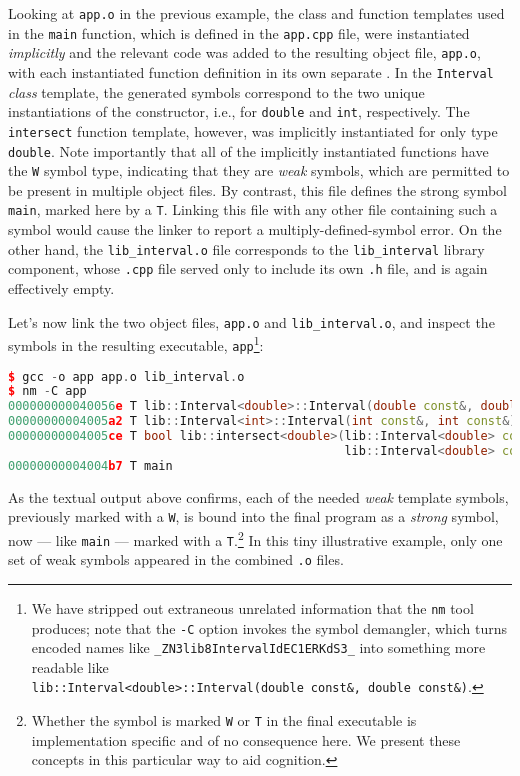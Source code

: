 \noindent Looking at \lstinline!app.o! in the previous example, the class and
function templates used in the \lstinline!main! function, which is
defined in the \lstinline!app.cpp! file, were instantiated
\emph{implicitly} and the relevant code was added to the resulting
object file, \lstinline!app.o!, with each instantiated function definition
in its own separate . In the \lstinline!Interval!
\emph{class} template, the generated symbols correspond to the two
unique instantiations of the constructor, i.e., for \lstinline!double! and
\lstinline!int!, respectively. The \lstinline!intersect! function 
template, however, was implicitly instantiated for only type
\lstinline!double!. Note importantly that all of the implicitly
instantiated functions have the \lstinline!W! symbol type, indicating that
they are \emph{weak} symbols, which are permitted to be present in
multiple object files. By contrast, this file defines the strong symbol
\lstinline!main!, marked here by a \lstinline!T!. Linking this file with any
other file containing such a symbol would cause the linker to report a
multiply-defined-symbol error. On the other hand, the
\lstinline!lib_interval.o! file corresponds to the
\lstinline!lib_interval! library component, whose \lstinline!.cpp! file
served only to include its own \lstinline!.h! file, and is again
effectively empty.

Let's now link the two object files, \lstinline!app.o! and
\lstinline!lib_interval.o!, and inspect the symbols in the resulting
executable, \lstinline!app!{\cprotect\footnote{We have stripped out
extraneous unrelated information that the \lstinline!nm! tool produces;
note that the \lstinline!-C! option invokes the symbol demangler, which
turns encoded names like \lstinline!_ZN3lib8IntervalIdEC1ERKdS3_! into
something more readable like
  \lstinline!lib::Interval<double>::Interval(double!~\lstinline!const&,!~\lstinline!double!~\lstinline!const&)!.}}:

\begin{lstlisting}[language=C++]
$ gcc -o app app.o lib_interval.o
$ nm -C app
000000000040056e T lib::Interval<double>::Interval(double const&, double const&)
00000000004005a2 T lib::Interval<int>::Interval(int const&, int const&)
00000000004005ce T bool lib::intersect<double>(lib::Interval<double> const&,
                                               lib::Interval<double> const&)
00000000004004b7 T main
\end{lstlisting}
    
\noindent As the textual output above confirms, each of the needed \emph{weak}
template symbols, previously marked with a \lstinline!W!, is bound into the
final program as a \emph{strong} symbol, now --- like \lstinline!main! ---
marked with a \lstinline!T!.{\cprotect\footnote{Whether the symbol is
marked \lstinline!W! or \lstinline!T! in the final executable is
implementation specific and of no consequence here. We present these
  concepts in this particular way to aid cognition.}} In this tiny
illustrative example, only one set of weak symbols appeared in the
combined \lstinline!.o! files.

